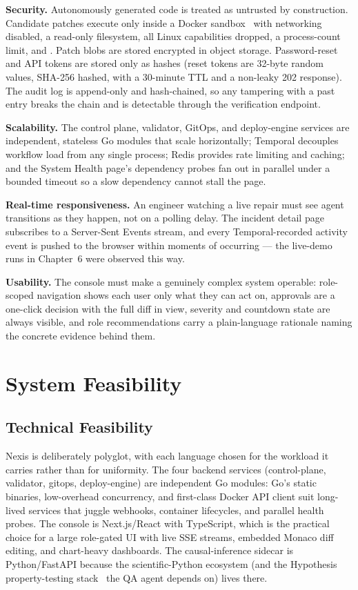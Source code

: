 \textbf{Security.} Autonomously generated code is treated as untrusted by
construction. Candidate patches execute only inside a Docker
sandbox~\cite{docker} with networking disabled, a read-only filesystem, all
Linux capabilities dropped, a process-count limit, and
. Patch blobs are stored encrypted in object storage.
Password-reset and API tokens are stored only as hashes (reset tokens are
32-byte random values, SHA-256 hashed, with a 30-minute TTL and a non-leaky
202 response). The audit log is append-only and hash-chained, so any
tampering with a past entry breaks the chain and is detectable through the
verification endpoint.

\textbf{Scalability.} The control plane, validator, GitOps, and deploy-engine
services are independent, stateless Go modules that scale horizontally;
Temporal decouples workflow load from any single process; Redis provides
rate limiting and caching; and the System Health page's dependency probes
fan out in parallel under a bounded timeout so a slow dependency cannot
stall the page.

\textbf{Real-time responsiveness.} An engineer watching a live repair must
see agent transitions as they happen, not on a polling delay. The incident
detail page subscribes to a Server-Sent Events stream, and every
Temporal-recorded activity event is pushed to the browser within moments of
occurring --- the live-demo runs in Chapter~6 were observed this way.

\textbf{Usability.} The console must make a genuinely complex system
operable: role-scoped navigation shows each user only what they can act on,
approvals are a one-click decision with the full diff in view, severity and
countdown state are always visible, and role recommendations carry a
plain-language rationale naming the concrete evidence behind them.

\section{System Feasibility}

\subsection{Technical Feasibility}

Nexis is deliberately polyglot, with each language chosen for the workload it
carries rather than for uniformity. The four backend services
(control-plane, validator, gitops, deploy-engine) are independent Go modules:
Go's static binaries, low-overhead concurrency, and first-class Docker API
client suit long-lived services that juggle webhooks, container lifecycles,
and parallel health probes. The console is Next.js/React with TypeScript,
which is the practical choice for a large role-gated UI with live SSE
streams, embedded Monaco diff editing, and chart-heavy dashboards. The
causal-inference sidecar is Python/FastAPI because the scientific-Python
ecosystem (and the Hypothesis property-testing stack~\cite{hypothesis} the QA
agent depends on) lives there.

